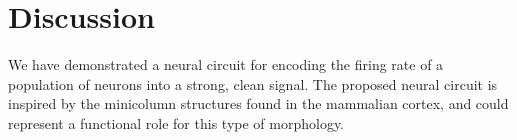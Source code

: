 \documentclass[a4paper,11pt]{article}
\begin{document}
\clearpage
\section{Discussion}
We have demonstrated a neural circuit for encoding the firing rate of a population of neurons into a strong, clean signal.
The proposed neural circuit is inspired by the minicolumn structures found in the mammalian cortex, and could represent a functional role for this type of morphology.


\clearpage
\printbibliography
\end{document}
